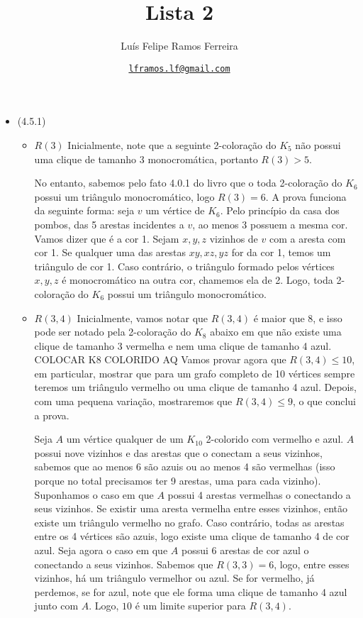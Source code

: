 \documentclass{article}
\title{Lista 2}
\author{Luís Felipe Ramos Ferreira}
\date{\href{mailto:lframos.lf@gmail.com}{\texttt{lframos.lf@gmail.com}}
}
\begin{document}
\maketitle

\begin{itemize}
	\item (4.5.1)
		\begin{itemize}
			\item \(R(3)\)
				Inicialmente, note que a seguinte 2-coloração do \(K_5\) não possui uma clique de tamanho 3 monocromática, portanto
				\(R(3) > 5\). 

				No entanto, sabemos pelo fato 4.0.1 do livro que o toda 2-coloração do \(K_6\) possui um triângulo monocromático, logo \(R(3) = 6\).
				A prova funciona da seguinte forma: seja \(v\) um vértice de \(K_6\). Pelo princípio da casa dos pombos, das 5 arestas incidentes a \(v\),
				ao menos 3 possuem a mesma cor. Vamos dizer que é a cor 1. Sejam \(x, y, z\) vizinhos de \(v\) com a aresta com cor 1. Se qualquer uma das arestas
				\(xy, xz, yz\) for da cor 1, temos um triângulo de cor 1. Caso contrário, o triângulo formado pelos vértices \(x, y, z\) é monocromático na outra cor,
				chamemos ela de 2. Logo, toda 2-coloração do \(K_6\) possui um triângulo monocromático.
			\item \(R(3, 4)\)
				Inicialmente, vamos notar que \(R(3, 4)\) é maior que 8, e isso pode ser notado pela 2-coloração do \(K_8\) abaixo em que
				não existe uma clique de tamanho 3 vermelha e nem uma clique de tamanho 4 azul.
				COLOCAR K8 COLORIDO AQ
				Vamos provar agora que \(R(3, 4) \leq 10\), em particular, mostrar que para um grafo completo de 10 vértices sempre teremos um triângulo
				vermelho ou uma clique de tamanho 4 azul. Depois, com uma pequena variação, mostraremos que \(R(3,4) \leq 9\), o que conclui a prova.

				Seja \(A\) um vértice qualquer de um \(K_10\) 2-colorido com vermelho e azul. \(A\) possui nove vizinhos e das arestas que o conectam a seus vizinhos,
				sabemos que ao menos 6 são azuis ou ao menos 4 são vermelhas (isso porque no total precisamos ter 9 arestas, uma para cada vizinho). Suponhamos o caso em que
				\(A\) possui 4 arestas vermelhas o conectando a seus vizinhos. Se existir uma aresta vermelha entre esses vizinhos, então existe um triângulo vermelho no grafo. Caso
				contrário, todas as arestas entre os 4 vértices são azuis, logo existe uma clique de tamanho 4 de cor azul. Seja agora o caso em que \(A\) possui
				6 arestas de cor azul o conectando a seus vizinhos. Sabemos que \(R(3, 3) = 6\), logo, entre esses vizinhos, há um triângulo vermelhor ou azul. Se for vermelho,
				já perdemos, se for azul, note que ele forma uma clique de tamanho 4 azul junto com \(A\). Logo, \(10\) é um limite superior para \(R(3, 4)\).
				

\end{itemize}
\end{itemize}
\end{document}
